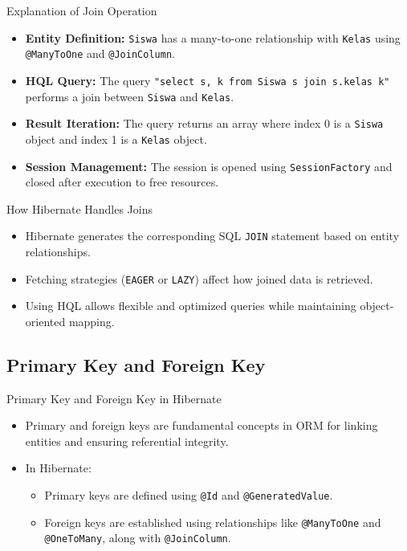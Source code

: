 \documentclass[aspectratio=169, table]{beamer}
\begin{document}
\begin{frame}{Explanation of Join Operation}
	\vspace{20pt}
	\begin{itemize}
		\item \textbf{Entity Definition:} \texttt{Siswa} has a many-to-one relationship with \texttt{Kelas} using \texttt{@ManyToOne} and \texttt{@JoinColumn}.
		\item \textbf{HQL Query:} The query \texttt{"select s, k from Siswa s join s.kelas k"} performs a join between \texttt{Siswa} and \texttt{Kelas}.
		\item \textbf{Result Iteration:} The query returns an array where index 0 is a \texttt{Siswa} object and index 1 is a \texttt{Kelas} object.
		\item \textbf{Session Management:} The session is opened using \texttt{SessionFactory} and closed after execution to free resources.
	\end{itemize}
\end{frame}

\begin{frame}{How Hibernate Handles Joins}
	\vspace{20pt}
	\begin{itemize}
		\item Hibernate generates the corresponding SQL \texttt{JOIN} statement based on entity relationships.
		\item Fetching strategies (\texttt{EAGER} or \texttt{LAZY}) affect how joined data is retrieved.
		\item Using HQL allows flexible and optimized queries while maintaining object-oriented mapping.
	\end{itemize}
\end{frame}

\subsection{Primary Key and Foreign Key}

\begin{frame}{Primary Key and Foreign Key in Hibernate}
	\vspace{20pt}
	\begin{itemize}
		\item Primary and foreign keys are fundamental concepts in ORM for linking entities and ensuring referential integrity.
		\item In Hibernate:
		\begin{itemize}
			\item Primary keys are defined using \texttt{@Id} and \texttt{@GeneratedValue}.
			\item Foreign keys are established using relationships like \texttt{@ManyToOne} and \texttt{@OneToMany}, along with \texttt{@JoinColumn}.
		\end{itemize}
	\end{itemize}
\end{frame}
\end{document}
